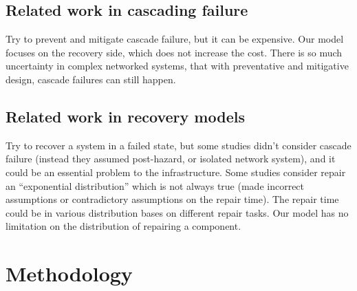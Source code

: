 \documentclass[runningheads]{llncs}
\begin{document}
\subsection{Related work in cascading failure}
Try to prevent and mitigate cascade failure, but it can be expensive. Our model focuses on the recovery side, which does not increase the cost.
There is so much uncertainty in complex networked systems, that with preventative and mitigative design, cascade failures can still happen. 

\subsection{Related work in recovery models}
Try to recover a system in a failed state, but some studies didn’t consider cascade failure (instead they assumed post-hazard, or isolated network system), and it could be an essential problem to the infrastructure. Some studies consider repair an “exponential distribution” which is not always true (made incorrect assumptions or contradictory assumptions on the repair time). The repair time could be in various distribution bases on different repair tasks. Our model has no limitation on the distribution of repairing a component.


\section{Methodology}

\end{document}

